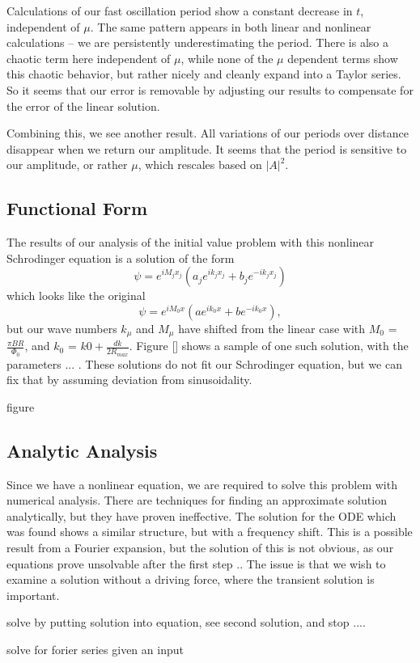 \documentclass[A4,12pt,oneside]{article}
\renewcommand{\(}{\left(}
\renewcommand{\)}{\right)}
\begin{document}
Calculations of our fast oscillation period show a constant decrease in $t$, independent of $\mu$. The same pattern appears in both linear and nonlinear calculations -- we are persistently underestimating the period. There is also a chaotic term here independent of $\mu$, while none of the $\mu$ dependent terms show this chaotic behavior, but rather nicely and cleanly expand into a Taylor series. So it seems that our error is removable by adjusting our results to compensate for the error of the linear solution. 

Combining this, we see another result. All variations of our periods over distance disappear when we return our amplitude. It seems that the period is sensitive to our amplitude, or rather $\mu$, which rescales based on $\left|A\right|^2$. 

\subsection{Functional Form}

The results of our analysis of the initial value problem with this nonlinear Schrodinger equation is a solution of the form
\begin{equation}
\psi = e^{i M_j x_j} \left( a_j e^{i k_j x_j} + b_j e^{- i k_j x_j} \right)
\end{equation}
which looks like the original 
\begin{equation}
\psi = e^{i M_0 x} \left( a e^{i k_0 x} + b e^{- i k_0 x} \right),
\end{equation}
but our wave numbers $k_{\mu}$ and $M_{\mu}$ have shifted from the linear case with $M_{0}$ = $\frac{\pi BR}{\Phi_0}$, and $k_{0}$ = $k0 + \frac{dk}{2  R_{max} }$. Figure [] shows a sample of one such solution, with the parameters ... . These solutions do not fit our Schrodinger equation, but we can fix that by assuming deviation from sinusoidality. 

figure

\subsection{Analytic Analysis}
Since we have a nonlinear equation, we are required to solve this problem with numerical analysis. There are techniques for finding an approximate solution analytically, but they have proven ineffective. The solution for the ODE which was found shows a similar structure, but with a frequency shift. This is a possible result from a Fourier expansion, but the solution of this is not obvious, as our equations prove unsolvable after the first step .. The issue is that we wish to examine a solution without a driving force, where the transient solution is important. 

solve by putting solution into equation, see second solution, and stop
....

solve for forier series given an input
\end{document}
